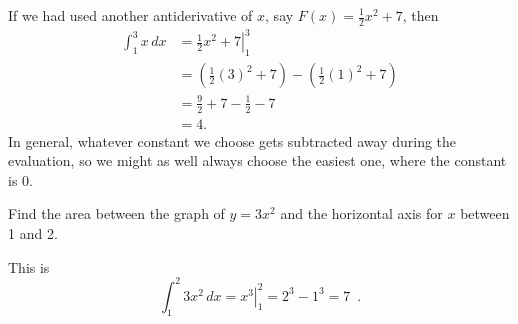 \begin{example}
\begin{enumerate}[label=(\alph*)]
\begin{solution}
     If we had used another antiderivative of $x$, say $F(x)=\frac{1}{2}x^2+7$, then
     \begin{align*}
     \int_1^3 x\, dx &= \left.\frac{1}{2}x^2 + 7\right|_1^3 \\
     &= \left(\frac{1}{2}(3)^2+ 7\right) - \left(\frac{1}{2}(1)^2+ 7\right)\\
     &= \frac{9}{2}+ 7 - \frac{1}{2} - 7 \\
     &= 4.
     \end{align*}
     In general, whatever constant we choose gets subtracted away during the evaluation, so we might as well always choose the easiest one, where the constant is 0.
     \end{solution}
   \end{enumerate}
\end{example}

\begin{example}
Find the area between the graph of $y=3x^2$ and the horizontal axis for $x$ between 1 and 2.

\begin{solution}
  This is
  $$\int_1^2 3x^2\, dx = \left. x^3 \right|_1^2 = 2^3-1^3=7 \enspace .$$
\end{solution}\end{example}

